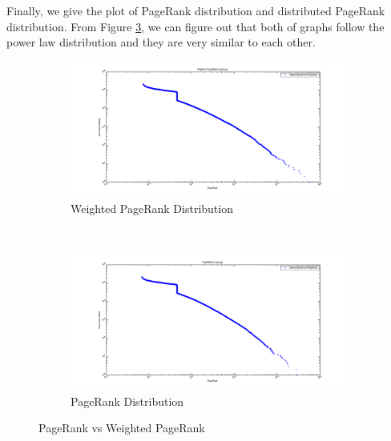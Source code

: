 Finally, we give the plot of PageRank distribution and distributed PageRank distribution. From Figure \ref{fig:results8-2}, we can figure out that both of graphs follow the power law distribution and they are very similar to each other.
\begin{figure}
    \centering
    \begin{subfigure}[htbp]{0.8\textwidth}
            \includegraphics[width=\textwidth]{FIG/dw_pr.png}
            \caption{Weighted PageRank Distribution}
            \label{fig:dw-pr}
    \end{subfigure}
    ~ %
    \begin{subfigure}[htbp]{0.8\textwidth}
            \includegraphics[width=\textwidth]{FIG/pr.png}
            \caption{PageRank Distribution}
            \label{fig:dw-pr2}
    \end{subfigure}
    \caption{PageRank vs Weighted PageRank}
        \label{fig:results8-2}
\end{figure}